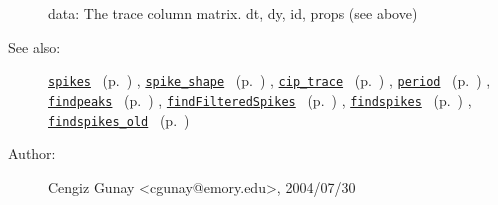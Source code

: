 \begin{description}
	data: The trace column matrix.
	dt, dy, id, props (see above)
%
%
\item[See also:]%
\hyperlink{ref_spikes}{\texttt{spikes}}%
\ (p.~\pageref{ref_spikes})%
%
, \hyperlink{ref_spike_shape}{\texttt{spike\_shape}}%
\ (p.~\pageref{ref_spike_shape})%
%
, \hyperlink{ref_cip_trace}{\texttt{cip\_trace}}%
\ (p.~\pageref{ref_cip_trace})%
%
, \hyperlink{ref_period}{\texttt{period}}%
\ (p.~\pageref{ref_period})%
%
, \hyperlink{ref_findpeaks}{\texttt{findpeaks}}%
\ (p.~\pageref{ref_findpeaks})%
%
, \hyperlink{ref_findFilteredSpikes}{\texttt{findFilteredSpikes}}%
\ (p.~\pageref{ref_findFilteredSpikes})%
%
, \hyperlink{ref_findspikes}{\texttt{findspikes}}%
\ (p.~\pageref{ref_findspikes})%
%
, \hyperlink{ref_findspikes_old}{\texttt{findspikes\_old}}%
\ (p.~\pageref{ref_findspikes_old})%
%
%
\item[Author:]%
Cengiz Gunay <cgunay@emory.edu>, 2004/07/30
%
\end{description}
\methodline%
